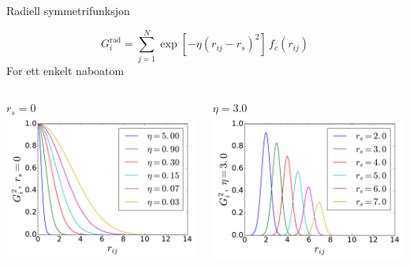 \documentclass{beamer}
\begin{document}
\begin{frame}{Radiell symmetrifunksjon}

\begin{equation*}
 G_i^\mathrm{rad} = \sum_{j=1}^N \exp[-\eta(r_{ij}-r_s)^2] \,f_c(r_{ij})
\end{equation*}
\newline
\centering
For ett enkelt naboatom
\begin{columns} %
  \begin{column}{0.5\linewidth} %
   \centering
   $r_s = 0$
   \includegraphics[width=\linewidth]{../Figures/Presentation/G2_1.pdf}
  \end{column}
  \begin{column}{0.5\linewidth} %
   \centering
   $\eta = 3.0$
   \includegraphics[width=\linewidth]{../Figures/Presentation/G2_2.pdf}
  \end{column}
\end{columns}

\end{frame}
\end{document}

